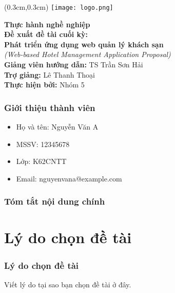\usepackage[absolute,overlay]{textpos}
\usepackage{graphicx}

\begin{frame}
\placelogofalse

\begin{textblock*}{3cm}(0.3cm,0.3cm) %
    \texttt{[image: logo.png]}
\end{textblock*}

\vspace{1cm} %

\centering
{\LARGE \textbf{Thực hành nghề nghiệp}}\\[0.5cm]

{\large \textbf{Đề xuất đề tài cuối kỳ:}}\\[0.3cm]
{\Large \textbf{Phát triển ứng dụng web quản lý khách sạn}}\\
{\large \textit{(Web-based Hotel Management Application Proposal)}}\\[1.2cm]

{\normalsize \textbf{Giảng viên hướng dẫn:} TS Trần Sơn Hải}\\[0.2cm]
{\normalsize \textbf{Trợ giảng:} Lê Thanh Thoại}\\[0.2cm]
{\normalsize \textbf{Thực hiện bởi:} Nhóm 5}

\end{frame}


\placelogotrue

\begin{frame}
    \frametitle{Giới thiệu thành viên}
    \begin{itemize}
        \item Họ và tên: Nguyễn Văn A
        \item MSSV: 12345678
        \item Lớp: K62CNTT
        \item Email: nguyenvana@example.com
    \end{itemize}
\end{frame}

\begin{frame}
    \frametitle{Tóm tắt nội dung chính}
    \tableofcontents
\end{frame}

\section{Lý do chọn đề tài}
\begin{frame}
    \frametitle{Lý do chọn đề tài}
    Viết lý do tại sao bạn chọn đề tài ở đây.
\end{frame}

